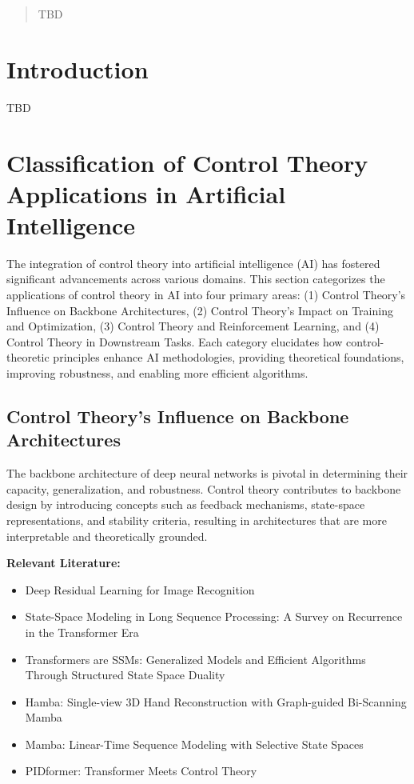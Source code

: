 \documentclass{article}
\theoremstyle{plain}
\theoremstyle{definition}
\theoremstyle{remark}
\begin{document}
\begin{abstract}
TBD
\end{abstract}

\section{Introduction}
TBD

\section{Classification of Control Theory Applications in Artificial Intelligence}

The integration of control theory into artificial intelligence (AI) has fostered significant advancements across various domains. This section categorizes the applications of control theory in AI into four primary areas: (1) Control Theory's Influence on Backbone Architectures, (2) Control Theory's Impact on Training and Optimization, (3) Control Theory and Reinforcement Learning, and (4) Control Theory in Downstream Tasks. Each category elucidates how control-theoretic principles enhance AI methodologies, providing theoretical foundations, improving robustness, and enabling more efficient algorithms.

\subsection{Control Theory's Influence on Backbone Architectures}

The backbone architecture of deep neural networks is pivotal in determining their capacity, generalization, and robustness. Control theory contributes to backbone design by introducing concepts such as feedback mechanisms, state-space representations, and stability criteria, resulting in architectures that are more interpretable and theoretically grounded.

\textbf{Relevant Literature:}
\begin{itemize}
    \item Deep Residual Learning for Image Recognition
    \item State-Space Modeling in Long Sequence Processing: A Survey on Recurrence in the Transformer Era
    \item Transformers are SSMs: Generalized Models and Efficient Algorithms Through Structured State Space Duality
    \item Hamba: Single-view 3D Hand Reconstruction with Graph-guided Bi-Scanning Mamba
    \item Mamba: Linear-Time Sequence Modeling with Selective State Spaces
    \item PIDformer: Transformer Meets Control Theory
\end{itemize}
\end{document}
